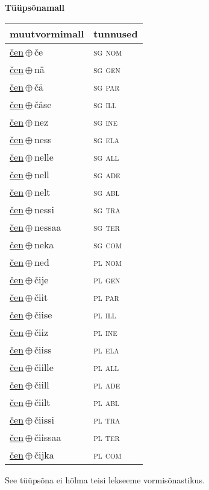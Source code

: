 

\vspace{3.5em}
\noindent \begin{minipage}{\textwidth}
\noindent \textbf{Tüüpsõnamall \,}\\

\begin{sideways}
\begin{tabular}{l l}
muutvormimall & tunnused \\
\hline
\underline{čen}\,$\oplus$\,če & \textsc{ sg nom } \\
\underline{čen}\,$\oplus$\,nä & \textsc{ sg gen } \\
\underline{čen}\,$\oplus$\,čä & \textsc{ sg par } \\
\underline{čen}\,$\oplus$\,čäse & \textsc{ sg ill } \\
\underline{čen}\,$\oplus$\,nez & \textsc{ sg ine } \\
\underline{čen}\,$\oplus$\,ness & \textsc{ sg ela } \\
\underline{čen}\,$\oplus$\,nelle & \textsc{ sg all } \\
\underline{čen}\,$\oplus$\,nell & \textsc{ sg ade } \\
\underline{čen}\,$\oplus$\,nelt & \textsc{ sg abl } \\
\underline{čen}\,$\oplus$\,nessi & \textsc{ sg tra } \\
\underline{čen}\,$\oplus$\,nessaa & \textsc{ sg ter } \\
\underline{čen}\,$\oplus$\,neka & \textsc{ sg com } \\
\underline{čen}\,$\oplus$\,ned & \textsc{ pl nom } \\
\underline{čen}\,$\oplus$\,čije & \textsc{ pl gen } \\
\underline{čen}\,$\oplus$\,čiit & \textsc{ pl par } \\
\underline{čen}\,$\oplus$\,čiise & \textsc{ pl ill } \\
\underline{čen}\,$\oplus$\,čiiz & \textsc{ pl ine } \\
\underline{čen}\,$\oplus$\,čiiss & \textsc{ pl ela } \\
\underline{čen}\,$\oplus$\,čiille & \textsc{ pl all } \\
\underline{čen}\,$\oplus$\,čiill & \textsc{ pl ade } \\
\underline{čen}\,$\oplus$\,čiilt & \textsc{ pl abl } \\
\underline{čen}\,$\oplus$\,čiissi & \textsc{ pl tra } \\
\underline{čen}\,$\oplus$\,čiissaa & \textsc{ pl ter } \\
\underline{čen}\,$\oplus$\,čijka & \textsc{ pl com } \\
\end{tabular}
\end{sideways}
\label{tab:tüüpsõnamall-čenče}

\end{minipage}

 
\vspace{1em}
\noindent See tüüpsõna ei hõlma teisi lekseeme vormi\-sõnastikus.
